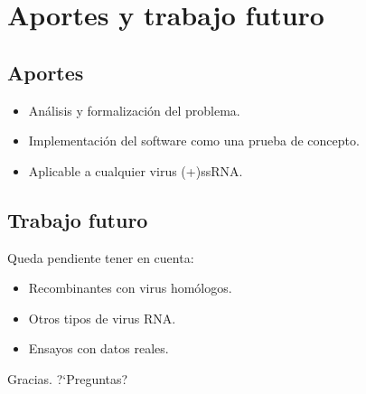 \documentclass{beamer}
\begin{document}
\section{Aportes y trabajo futuro}
\subsection{Aportes}
\begin{frame}
 \begin{itemize}
  \item An\'alisis y formalizaci\'on del problema.
  \item Implementaci\'on del software como una prueba de concepto.
  \item Aplicable a cualquier virus (+)ssRNA.
 \end{itemize}
\end{frame}

\subsection{Trabajo futuro}
\begin{frame}
Queda pendiente tener en cuenta:
  \begin{itemize}   
   \item Recombinantes con virus hom\'ologos.
   \item Otros tipos de virus RNA.
   \item Ensayos con datos reales.
  \end{itemize}
\end{frame}

\begin{frame}
\begin{center}
  \huge
 Gracias. ?`Preguntas?
\end{center}
\end{frame}
\end{document}
